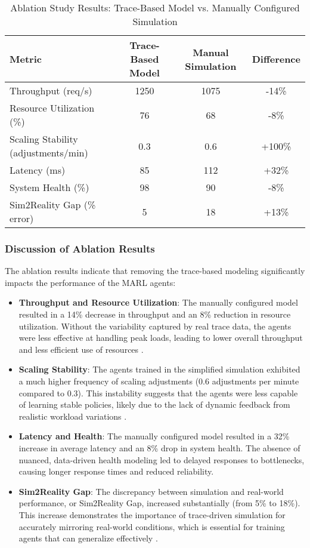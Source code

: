 \documentclass[conference]{IEEEtran}
\begin{document}
\begin{table}[h]
\centering
\caption{Ablation Study Results: Trace-Based Model vs. Manually Configured Simulation}
\label{tab:ablation_results}
\begin{tabular}{lccc}
\hline
\textbf{Metric} & \textbf{Trace-Based Model} & \textbf{Manual Simulation} & \textbf{Difference} \\
\hline
Throughput (req/s) & 1250 & 1075 & -14\% \\
Resource Utilization (\%) & 76 & 68 & -8\% \\
Scaling Stability (adjustments/min) & 0.3 & 0.6 & +100\% \\
Latency (ms) & 85 & 112 & +32\% \\
System Health (\%) & 98 & 90 & -8\% \\
Sim2Reality Gap (\% error) & 5 & 18 & +13\% \\
\hline
\end{tabular}
\end{table}

\subsubsection{Discussion of Ablation Results}

The ablation results indicate that removing the trace-based modeling significantly impacts the performance of the MARL agents:
\begin{itemize}
    \item \textbf{Throughput and Resource Utilization}: The manually configured model resulted in a 14\% decrease in throughput and an 8\% reduction in resource utilization. Without the variability captured by real trace data, the agents were less effective at handling peak loads, leading to lower overall throughput and less efficient use of resources \cite{tan_nn_resource_approx}.
    \item \textbf{Scaling Stability}: The agents trained in the simplified simulation exhibited a much higher frequency of scaling adjustments (0.6 adjustments per minute compared to 0.3). This instability suggests that the agents were less capable of learning stable policies, likely due to the lack of dynamic feedback from realistic workload variations \cite{nguyen_sim2reality}.
    \item \textbf{Latency and Health}: The manually configured model resulted in a 32\% increase in average latency and an 8\% drop in system health. The absence of nuanced, data-driven health modeling led to delayed responses to bottlenecks, causing longer response times and reduced reliability.
    \item \textbf{Sim2Reality Gap}: The discrepancy between simulation and real-world performance, or Sim2Reality Gap, increased substantially (from 5\% to 18\%). This increase demonstrates the importance of trace-driven simulation for accurately mirroring real-world conditions, which is essential for training agents that can generalize effectively \cite{schleich_digital_twin}.
\end{itemize}
\end{document}
